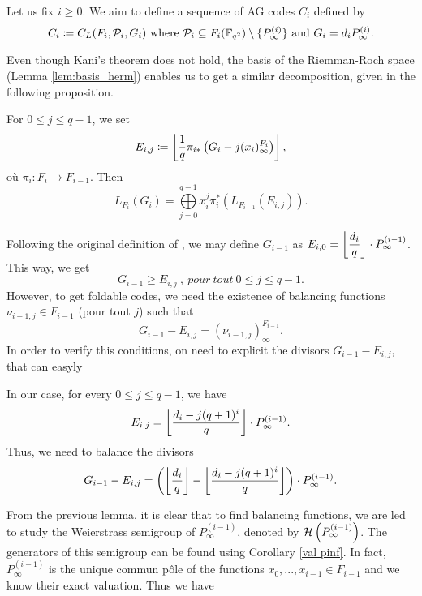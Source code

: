 \documentclass[10pt]{article}
\begin{document}
Let us fix $i \geq 0$. We aim to define a sequence of AG codes $C_i$ defined by 
\[C_i \coloneqq C_L(F_i,\mathcal{P}_{i},G_i) \text{ where } \mathcal{P}_{i} \subseteq F_i(\mathbb{F}_{q^2}) \setminus \{P_\infty^{(i)}\} \text{ and } G_i = d_iP^{(i)}_{\infty}.\]

Even though Kani's theorem does not hold, the basis of the Riemman-Roch space (Lemma \ref{lem:basis_herm}) enables us to get a similar decomposition, given in the following proposition.

\begin{proposition} 
	For $0 \leq j \leq q-1$, we set
	\[E_{i,j} \coloneqq \left\lfloor \frac{1}{q} \pi_{i*}\left(G_i-j(x_i)^{F_i}_{\infty}\right)\right\rfloor,\]
	où $\pi_i : F_i \rightarrow F_{i-1}$. Then 
\[L_{F_i}(G_i) = \bigoplus\limits_{j=0}^{q-1} x_i^j \pi_i^*\left(L_{F_{i-1}}(E_{i,j})\right).\]
\end{proposition}

Following the original definition of \cite{BN20}, we may define $G_{i-1}$ as $E_{i,0} = \left\lfloor \dfrac{d_i}{q} \right\rfloor \cdot P^{(i-1)}_{\infty}$. This way, we get 
\[G_{i-1} \geq E_{i,j} \ , \ pour \ tout \ 0 \leq j \leq q-1.\] 
However, to get foldable codes, we need the existence of balancing functions  $\nu_{i-1,j} \in F_{i-1}$ (pour tout $j$) such that 
\begin{equation}\label{eq:balancing_fct_herm}
	G_{i-1}-E_{i,j} = (\nu_{i-1,j})^{F_{i-1}}_{\infty}.
\end{equation}
In order to verify this conditions, on need to explicit the divisors $G_{i-1}-E_{i,j}$, that can easyly 

\begin{lemma} \label{divisor à équi}
In our case, for every $0 \leq j \leq q-1$, we have
\[E_{i,j} = \left\lfloor \dfrac{d_i-j(q+1)^i}{q}\right\rfloor \cdot P^{(i-1)}_{\infty}.\]
Thus, we need to balance the divisors
\[G_{i-1}-E_{i,j} = \left(\left\lfloor \dfrac{d_i}{q} \right\rfloor - \left\lfloor \dfrac{d_i-j(q+1)^i}{q}\right\rfloor\right) \cdot P^{(i-1)}_{\infty}.\]

\end{lemma}

From the previous lemma, it is clear that to find balancing functions, we are led to study the Weierstrass semigroup of $P^{(i-1)}_{\infty}$, denoted by $\mathcal{H}\left(P^{(i-1)}_{\infty}\right)$. The generators of this semigroup can be found using Corollary \ref{val pinf}. In fact, $P_{\infty}^{(i-1)}$ is the unique commun pôle of the functions $x_0,...,x_{i-1} \in 
F_{i-1}$ and we know their exact valuation. Thus we have
\end{document}
